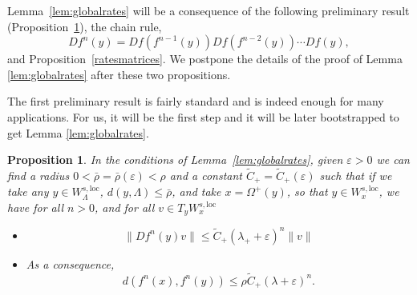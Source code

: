 \documentclass[11pt]{amsart}
\newtheorem{prop}[thm]{Proposition}
\theoremstyle{definition}
\theoremstyle{remark}
\numberwithin{equation}{section}
\newcommand{\eps}{\varepsilon}
\begin{document}
Lemma~\ref{lem:globalrates} will be a consequence  of the following preliminary result (Proposition~\ref{provisional}),  the chain rule,
\begin{equation}\label{chain}
Df^n(y) = Df(f^{n-1}(y)) Df(f^{n-2}(y))\cdots Df(y),
\end{equation}
and Proposition~\ref{ratesmatrices}.  We postpone the details of the proof of
Lemma \ref{lem:globalrates} after these two  propositions.


The first preliminary result is fairly standard and is indeed enough for many applications.
For us, it will be the first step and it will be later bootstrapped
to get Lemma \ref{lem:globalrates}.

\begin{prop} \label{provisional}
 In the conditions of Lemma~\ref{lem:globalrates}, given $\eps  >0$ we can find a radius
 $0<\bar \rho =\bar \rho (\eps) <\rho$ and a constant $\tilde{C}_{+}=\tilde{C}_{+}(\eps)$
 such that if we take  any
 $y \in W^{s,\mathrm{loc}}_\Lambda$,
 $d(y, \Lambda) \le \bar \rho$, and take $x=\Omega^+(y)$, so that $y \in W^{s,\mathrm{loc}}_x$,
 we have for all $n >0 $, and for all
$v\in T_{y} W_{x}^{s,\mathrm{loc}}$
\begin{itemize}
\item[(i)]
\[
\|Df^n(y) v\|  \le \tilde{C}_{+} (\lambda_+ +\eps)^n  \|v\|
\]
\item[(ii)]
As a consequence,
\[
    d(f^n(x), f^n(y)) \le \rho \tilde{C}_{+} (\lambda + \eps)^n .
\]
\end{itemize}
\end{prop}
\end{document}
